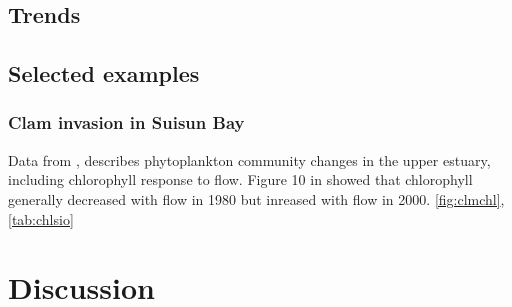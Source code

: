 \documentclass[letterpaper,12pt,oneside]{article}\usepackage[]{graphicx}\usepackage[]{color}
\begin{document}
\subsection{Trends}

\subsection{Selected examples}

\subsubsection{Clam invasion in Suisun Bay}
Data from \citep{Crauder16}, \citet{Jassby08} describes phytoplankton community changes in the upper estuary, including chlorophyll response to flow.  Figure 10 in \citet{Jassby08} showed that chlorophyll generally decreased with flow in 1980 but inreased with flow in 2000.
\cref{fig:clmchl}, \cref{tab:chlsio}

\section{Discussion}

\clearpage
\begin{singlespace}


\end{singlespace}
\clearpage
\end{document}
